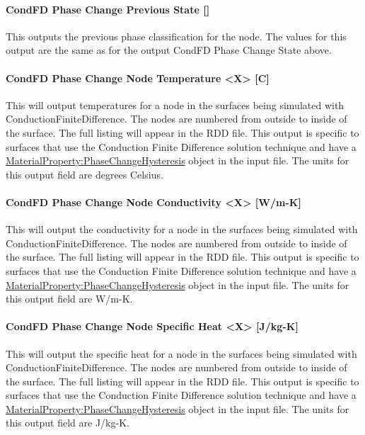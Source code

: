 \paragraph{CondFD Phase Change Previous State {[]}}\label{condfd-phase-change-previous-state}

This outputs the previous phase classification for the node.  The values for this output are the same as for the output CondFD Phase Change State above.

\paragraph{CondFD Phase Change Node Temperature \textless{}X\textgreater{} {[}C{]}}\label{condfd-phase-change-node-temperature-x-c}

This will output temperatures for a node in the surfaces being simulated with ConductionFiniteDifference. The nodes are numbered from outside to inside of the surface.  The full listing will appear in the RDD file.  This output is specific to surfaces that use the Conduction Finite Difference solution technique and have a \hyperref[materialpropertyphasechangehysteresis]{MaterialProperty:PhaseChangeHysteresis} object in the input file.  The units for this output field are degrees Celsius.

\paragraph{CondFD Phase Change Node Conductivity \textless{}X\textgreater{} {[}W/m-K{]}}\label{condfd-phase-change-node-conductivity-x-w-m-k}

This will output the conductivity for a node in the surfaces being simulated with ConductionFiniteDifference.  The nodes are numbered from outside to inside of the surface. The full listing will appear in the RDD file.  This output is specific to surfaces that use the Conduction Finite Difference solution technique and have a \hyperref[materialpropertyphasechangehysteresis]{MaterialProperty:PhaseChangeHysteresis} object in the input file.  The units for this output field are W/m-K.

\paragraph{CondFD Phase Change Node Specific Heat \textless{}X\textgreater{} {[}J/kg-K{]}}\label{condfd-phase-change-node-specific-heat-x-j-kg-k}

This will output the specific heat for a node in the surfaces being simulated with ConductionFiniteDifference.  The nodes are numbered from outside to inside of the surface. The full listing will appear in the RDD file.  This output is specific to surfaces that use the Conduction Finite Difference solution technique and have a \hyperref[materialpropertyphasechangehysteresis]{MaterialProperty:PhaseChangeHysteresis} object in the input file. The units for this output field are J/kg-K.

